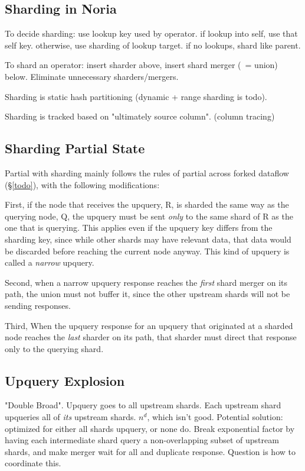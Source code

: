 \subsection{Sharding in Noria}

\begin{inprogress}
  To decide sharding: use lookup key used by operator. if lookup into self, use
  that self key. otherwise, use sharding of lookup target. if no lookups, shard
  like parent.

  To shard an operator: insert sharder above, insert shard merger (~= union)
  below. Eliminate unnecessary sharders/mergers.

  Sharding is static hash partitioning (dynamic + range sharding is todo).

  Sharding is tracked based on "ultimately source column". (column tracing)
\end{inprogress}

\subsection{Sharding Partial State}

Partial with sharding mainly follows the rules of partial across forked dataflow
(\S\ref{todo}), with the following modifications:

First, if the node that receives the upquery, R, is sharded the same way as the
querying node, Q, the upquery must be sent \emph{only} to the same shard of R as
the one that is querying. This applies even if the upquery key differs from the
sharding key, since while other shards may have relevant data, that data would
be discarded before reaching the current node anyway. This kind of upquery is
called a \emph{narrow} upquery.

Second, when a narrow upquery response reaches the \emph{first} shard merger on
its path, the union must not buffer it, since the other upstream shards will not
be sending responses.

Third, When the upquery response for an upquery that originated at a sharded
node reaches the \emph{last} sharder on its path, that sharder must direct that
response only to the querying shard.

\subsection{Upquery Explosion}

\begin{inprogress}
  "Double Broad". Upquery goes to all upstream shards. Each upstream shard
  upqueries all of \emph{its} upstream shards. $n^d$, which isn't good.
  Potential solution: optimized for either all shards upquery, or none do. Break
  exponential factor by having each intermediate shard query a non-overlapping
  subset of upstream shards, and make merger wait for all and duplicate
  response. Question is how to coordinate this.
\end{inprogress}

